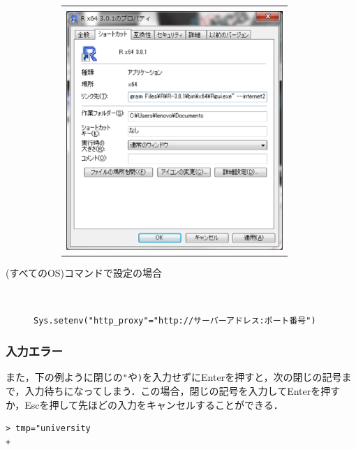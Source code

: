 \begin{description}
\begin{figure}[H]
\begin{center}
\begin{tabular}{c}
\begin{minipage}{0.65\hsize}
          にする．\\
          \includegraphics[width=8.2cm]{img/property.eps}
      \end{minipage}
    \end{tabular}
  \end{center}
\end{figure}
\item[(すべてのOS)コマンドで設定の場合]\mbox{}\\
\begin{screen}
\begin{verbatim}
Sys.setenv("http_proxy"="http://サーバーアドレス:ポート番号")
\end{verbatim}
\end{screen}
\end{description}
\subsubsection{入力エラー}
また，下の例ように閉じの\verb+"+や\verb+)+を入力せずにEnterを押すと，次の閉じの記号まで，入力待ちになってしまう．この場合，閉じの記号を入力してEnterを押すか，Escを押して先ほどの入力をキャンセルすることができる．
\begin{breakbox}
\begin{verbatim}
> tmp="university
+ 
\end{verbatim}
\end{breakbox}